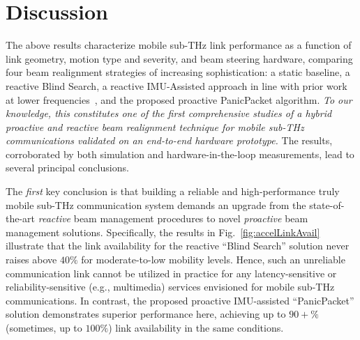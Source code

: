 \documentclass[fleqn,10pt]{wlscirep}
\begin{document}
\section*{Discussion}

The above results characterize mobile sub-THz link performance as a function of link geometry, motion type and severity, and beam steering hardware, comparing four beam realignment strategies of increasing sophistication: a static baseline, a reactive Blind Search, a reactive IMU-Assisted approach in line with prior work at lower frequencies~\cite{s141019622, Brambilla_2019}, and the proposed proactive PanicPacket algorithm. \emph{To our knowledge, this constitutes one of the first comprehensive studies of a hybrid proactive and reactive beam realignment technique for mobile sub-THz communications validated on an end-to-end hardware prototype.} The results, corroborated by both simulation and hardware-in-the-loop measurements, lead to several principal conclusions.

The \emph{first} key conclusion is that building a reliable and high-performance truly mobile sub-THz communication system demands an upgrade from the state-of-the-art \emph{reactive} beam management procedures to novel \emph{proactive} beam management solutions. Specifically, the results in Fig.~\ref{fig:accelLinkAvail} illustrate that the link availability for the reactive ``Blind Search'' solution never raises above $40\%$ for moderate-to-low mobility levels. Hence, such an unreliable communication link cannot be utilized in practice for any latency-sensitive or reliability-sensitive (e.g., multimedia) services envisioned for mobile sub-THz communications. In contrast, the proposed proactive IMU-assisted ``PanicPacket'' solution demonstrates superior performance here, achieving up to $90+\%$ (sometimes, up to $100\%$) link availability in the same conditions.
\end{document}
